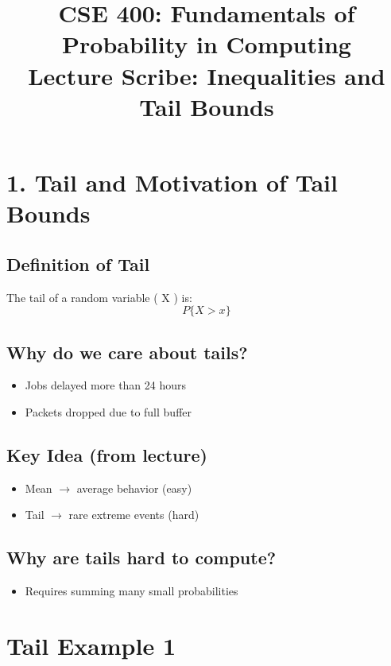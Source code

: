 \documentclass[11pt]{article}
\title{CSE 400: Fundamentals of Probability in Computing\\
Lecture Scribe: Inequalities and Tail Bounds}
\date{}
\begin{document}
\maketitle

\section*{1. Tail and Motivation of Tail Bounds}

\subsection*{Definition of Tail}

The tail of a random variable ( X ) is:
\[
P\{X > x\}
\]

\subsection*{Why do we care about tails?}

\begin{itemize}
\item Jobs delayed more than 24 hours
\item Packets dropped due to full buffer
\end{itemize}

\subsection*{Key Idea (from lecture)}

\begin{itemize}
\item Mean $\rightarrow$ average behavior (easy)
\item Tail $\rightarrow$ rare extreme events (hard)
\end{itemize}

\subsection*{Why are tails hard to compute?}

\begin{itemize}
\item Requires summing many small probabilities
\end{itemize}

\section*{Tail Example 1}
\end{document}
